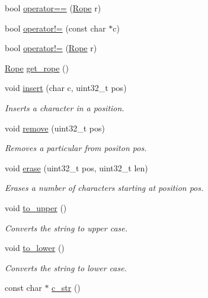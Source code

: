 \begin{DoxyCompactItemize}
bool \hyperlink{classetk_1_1_static_string_a21e9cc28db85354111ec1081e4f96400}{operator==} (\hyperlink{classetk_1_1_rope}{Rope} r)
\item 
bool \hyperlink{classetk_1_1_static_string_aa9905dea14fe61bbb43074b6844c1715}{operator!=} (const char $\ast$c)
\item 
bool \hyperlink{classetk_1_1_static_string_ab91fc0104f2fc206bd62249d4364f205}{operator!=} (\hyperlink{classetk_1_1_rope}{Rope} r)
\item 
\hyperlink{classetk_1_1_rope}{Rope} \hyperlink{classetk_1_1_static_string_a154223efd5135ba6ea4e553494d88753}{get\-\_\-rope} ()
\item 
void \hyperlink{classetk_1_1_static_string_a8ae54d52d386cf3817388a4ea6742f40}{insert} (char c, uint32\-\_\-t pos)
\begin{DoxyCompactList}\small\item\em Inserts a character in a position. \end{DoxyCompactList}\item 
void \hyperlink{classetk_1_1_static_string_a6d9a7ff340f49a308770c1d45c7b96e4}{remove} (uint32\-\_\-t pos)
\begin{DoxyCompactList}\small\item\em Removes a particular from positon pos. \end{DoxyCompactList}\item 
void \hyperlink{classetk_1_1_static_string_a0d3fb4e9dd789f9ab90fdd20d31fa683}{erase} (uint32\-\_\-t pos, uint32\-\_\-t len)
\begin{DoxyCompactList}\small\item\em Erases a number of characters starting at position pos. \end{DoxyCompactList}\item 
void \hyperlink{classetk_1_1_static_string_a1bfd64eb5df0f7162e3ee57542c23ba3}{to\-\_\-upper} ()
\begin{DoxyCompactList}\small\item\em Converts the string to upper case. \end{DoxyCompactList}\item 
void \hyperlink{classetk_1_1_static_string_a2d09b6cf3621102f7a5c3e0fea06591b}{to\-\_\-lower} ()
\begin{DoxyCompactList}\small\item\em Converts the string to lower case. \end{DoxyCompactList}\item 
const char $\ast$ \hyperlink{classetk_1_1_static_string_aa775f517938685482baa772fb6cb1734}{c\-\_\-str} ()

\end{DoxyCompactItemize}

